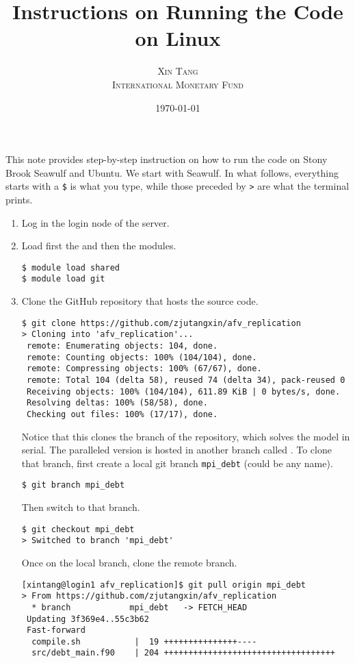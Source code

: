 \documentclass[twoside,11pt,leqno]{article}
\title{\vspace{-1cm}\Large{{\textsf{Instructions on Running the Code on Linux}}}}
\author{\normalsize\textsc{Xin Tang} \\ \normalsize\textsc{International Monetary Fund}}
\date{\normalsize\today}
\newcommand{\code}{\texttt}
\newcommand{\bcode}[1]{\texttt{\blue{#1}}}
\begin{document}
\maketitle

This note provides step-by-step instruction on how to run the code on Stony Brook Seawulf and Ubuntu. We start with Seawulf. In what follows, everything starts with a \code{\$} is what you type, while those preceded by \code{>} are what the terminal prints.
\begin{enumerate}[1.]
    \item
    Log in the login node of the server.
    \item
    Load first the \bcode{shared} and then the \bcode{git} modules.
\begin{verbatim}    
$ module load shared
$ module load git
\end{verbatim}
    \item
    Clone the GitHub repository that hosts the source code.
\begin{verbatim}
$ git clone https://github.com/zjutangxin/afv_replication
> Cloning into 'afv_replication'...
 remote: Enumerating objects: 104, done.
 remote: Counting objects: 100% (104/104), done.
 remote: Compressing objects: 100% (67/67), done.
 remote: Total 104 (delta 58), reused 74 (delta 34), pack-reused 0
 Receiving objects: 100% (104/104), 611.89 KiB | 0 bytes/s, done.
 Resolving deltas: 100% (58/58), done.
 Checking out files: 100% (17/17), done.  
\end{verbatim}    
    Notice that this clones the \bcode{master} branch of the repository, which solves the model in serial. The paralleled version is hosted in another branch called \bcode{mpi\_debt}. To clone that branch, first create a local git branch \code{mpi\_debt} (could be any name).
\begin{verbatim}    
$ git branch mpi_debt
\end{verbatim}
    Then switch to that branch.
\begin{verbatim}
$ git checkout mpi_debt
> Switched to branch 'mpi_debt'
\end{verbatim}
    Once on the local \bcode{mpi\_debt} branch, clone the remote branch.
\begin{verbatim}    
[xintang@login1 afv_replication]$ git pull origin mpi_debt
> From https://github.com/zjutangxin/afv_replication
  * branch            mpi_debt   -> FETCH_HEAD
 Updating 3f369e4..55c3b62
 Fast-forward
  compile.sh           |  19 +++++++++++++++----
  src/debt_main.f90    | 204 +++++++++++++++++++++++++++++++++++

\end{verbatim}
\end{enumerate}
\end{document}
